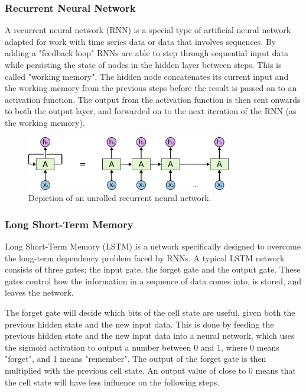 \subsubsection{Recurrent Neural Network}
A recurrent neural network (RNN) is a special type of artificial neural network adapted for work with time series data or data that involves sequences. \parencite{saeed_2021} 
By adding a "feedback loop" RNNs are able to step through sequential input data while persisting the state of nodes in the hidden layer between steps. This is called "working memory". The hidden node concatenates its current input and the working memory from the previous steps before the result is passed on to an activation function. The output from the activation function is then sent onwards to both the output layer, and forwarded on to the next iteration of the RNN (as the working memory).~\parencite{bouvet_2020}

\begin{figure}[H]
    \centering
    \includegraphics[width=0.8\textwidth]{data/Figures/Neural networks/RNN.png}
    \caption[Depiction of an unrolled recurrent neural network]{Depiction of an unrolled recurrent neural network.~\cite{khalajani_2023}}\label{fig:RNN}
\end{figure}

\subsubsection{Long Short-Term Memory} 
Long Short-Term Memory (LSTM) is a network specifically designed to overcome the long-term dependency problem faced by RNNs. 
A typical LSTM network consists of three gates; the input gate, the forget gate and the output gate.
These gates control how the information in a sequence of data comes into, is stored, and leaves the network.  

The forget gate will decide which bits of the cell state are useful, given both the previous hidden state and the new input data. 
This is done by feeding the previous hidden state and the new input data into a neural network, which uses the sigmoid activation to output a number between 0 and 1, where 0 means "forget", and 1 means "remember". 
The output of the forget gate is then multiplied with the previous cell state. An output value of close to 0 means that the cell state will have less influence on the following steps. 

